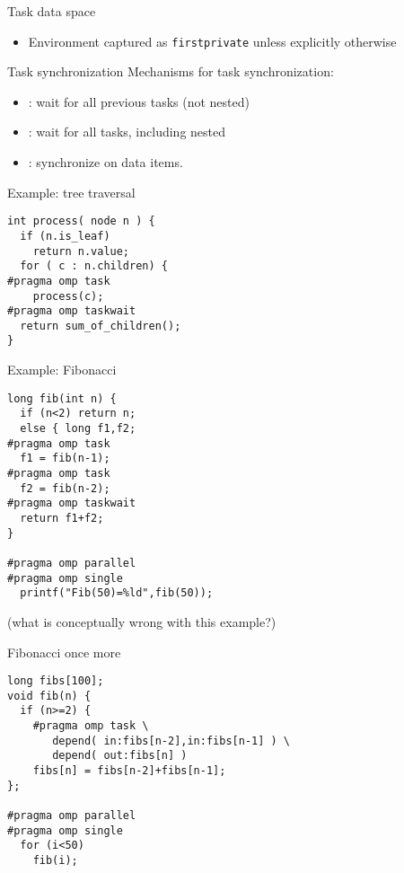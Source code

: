 \begin{exerciseframe}[taskfactor]
  
\end{exerciseframe}

\begin{numberedframe}{Task data space}
  \begin{itemize}
  \item Environment captured as \lstinline{firstprivate}
    unless explicitly otherwise
  \end{itemize}
\end{numberedframe}

\begin{numberedframe}{Task synchronization}
  Mechanisms for task synchronization:
  \begin{itemize}
  \item {}: wait for all previous tasks (not nested)
  \item {}: wait for all tasks, including nested
  \item {}: synchronize on data items.
  \end{itemize}
\end{numberedframe}

\begin{numberedframe}{Example: tree traversal}
\begin{verbatim}
int process( node n ) {
  if (n.is_leaf)
    return n.value;
  for ( c : n.children) {
#pragma omp task
    process(c);
#pragma omp taskwait
  return sum_of_children();
}
\end{verbatim}
\end{numberedframe}

\begin{numberedframe}{Example: Fibonacci}
\begin{verbatim}
long fib(int n) {
  if (n<2) return n;
  else { long f1,f2;
#pragma omp task
  f1 = fib(n-1);
#pragma omp task
  f2 = fib(n-2);
#pragma omp taskwait
  return f1+f2;
}

#pragma omp parallel
#pragma omp single
  printf("Fib(50)=%ld",fib(50));
\end{verbatim}
(what is conceptually wrong with this example?)
\end{numberedframe}

\begin{numberedframe}{Fibonacci once more}
\begin{verbatim}
long fibs[100];
void fib(n) {
  if (n>=2) {
    #pragma omp task \
       depend( in:fibs[n-2],in:fibs[n-1] ) \
       depend( out:fibs[n] )
    fibs[n] = fibs[n-2]+fibs[n-1];
};

#pragma omp parallel
#pragma omp single
  for (i<50)
    fib(i);
\end{verbatim}
\end{numberedframe}

